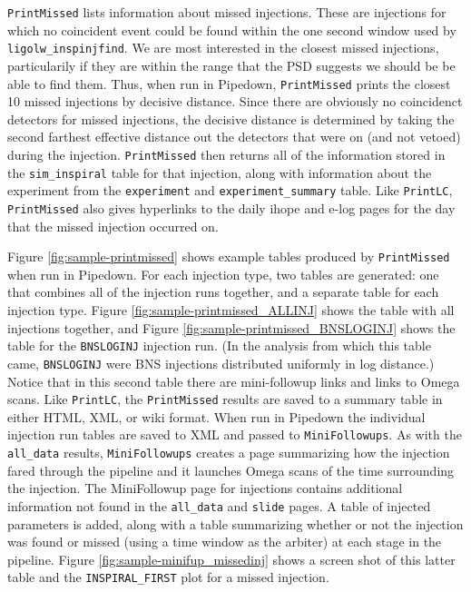\texttt{PrintMissed} lists information about missed injections. These are injections for
which no coincident event could be found within the one second window used by
\verb|ligolw_inspinjfind|. We are most interested in the closest missed
injections, particularily if they are within the range that the \ac{PSD}
suggests we should be be able to find them. Thus, when run in Pipedown,
\texttt{PrintMissed} prints the closest 10 missed injections by decisive distance. Since
there are obviously no coincidenct detectors for missed injections, the
decisive distance is determined by taking the second farthest effective
distance out the detectors that were on (and not vetoed) during the injection.
\texttt{PrintMissed} then returns all of the information stored in the
\verb|sim_inspiral| table for that injection, along with information about the
experiment from the \verb|experiment| and \verb|experiment_summary| table. Like
\texttt{PrintLC}, \texttt{PrintMissed} also gives hyperlinks to the daily ihope and e-log pages
for the day that the missed injection occurred on. 

Figure \ref{fig:sample-printmissed} shows example tables produced by
\texttt{PrintMissed} when run in Pipedown. For each injection type, two tables are
generated: one that combines all of the injection runs together, and a separate
table for each injection type. Figure \ref{fig:sample-printmissed_ALLINJ} shows
the table with all injections together, and Figure
\ref{fig:sample-printmissed_BNSLOGINJ} shows the table for the \verb|BNSLOGINJ|
injection run. (In the analysis from which this table came, \texttt{BNSLOGINJ}
were \ac{BNS} injections distributed uniformly in log distance.) Notice that in
this second table there are mini-followup links and links to Omega scans. Like
\texttt{PrintLC}, the \texttt{PrintMissed} results are saved to a summary table in either HTML,
XML, or wiki format. When run in Pipedown the individual injection run tables
are saved to XML and passed to \texttt{MiniFollowups}. As with the \verb|all_data|
results, \texttt{MiniFollowups} creates a page summarizing how the injection fared
through the pipeline and it launches Omega scans of the time surrounding the
injection. The MiniFollowup page for injections contains additional information
not found in the \verb|all_data| and \verb|slide| pages. A table of injected
parameters is added, along with a table summarizing whether or not the
injection was found or missed (using a time window as the arbiter) at each
stage in the pipeline. Figure \ref{fig:sample-minifup_missedinj} shows a screen
shot of this latter table and the \verb|INSPIRAL_FIRST| plot for a missed
injection.


